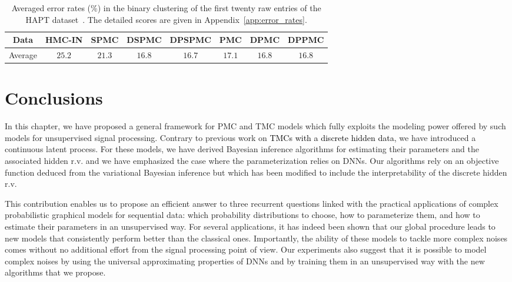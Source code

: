 

\begin{table}
  \small
\centering
\setlength\tabcolsep{6pt}
\begin{tabular}{cccccccc}
\toprule
 Data & HMC-IN & SPMC & DSPMC & DPSPMC & PMC & DPMC & DPPMC \\\toprule
Average & $25.2$ &$21.3$ &$16.8$ &$\pmb{16.7}$ &$17.1$ &$16.8$ & $16.8$ \\
\bottomrule
\end{tabular}
\caption{Averaged error rates (\%) in the binary clustering of the first twenty raw entries of the HAPT dataset~\citep{reyes2016transition}. 
The detailed scores are given in Appendix~\ref{app:error_rates}.}
\label{table:har_scores}
\end{table}


  

\section{Conclusions}
In this chapter, we have proposed a general framework for PMC and TMC models which
fully exploits the modeling power offered by such models for unsupervised signal
processing. Contrary to previous work on \textcolor{black}{TMCs with a discrete
hidden data}, we have introduced a continuous latent process. For these models,
we have derived Bayesian inference algorithms for estimating their parameters
and the associated hidden r.v. and we have emphasized the case where the
parameterization relies on DNNs. Our algorithms rely on an objective function
deduced from the variational Bayesian inference but which has been modified to
include the interpretability of the discrete hidden r.v.

This contribution enables us to propose an efficient answer to three recurrent
questions linked with the practical applications of complex probabilistic
graphical models for sequential data: which probability distributions to choose,
how to parameterize them, and how to estimate their parameters in an
unsupervised way. For several applications, it has indeed been shown that our
global procedure leads to new models that consistently perform better than the
classical ones. Importantly, the ability of these models to tackle more complex
noises comes without no additional effort from the signal processing point of
view. Our experiments also suggest that it is possible to model complex noises
by using the universal approximating properties of DNNs and by training them in
an unsupervised way with the new algorithms that we propose.

